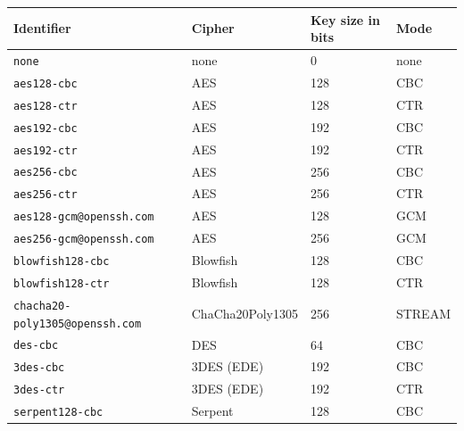\documentclass[synpaper]{book}
\begin{document}
\begin{table}[H]
\begin{small}
\begin{tabular}{|l|l|l|l|}
\hline \textbf{Identifier}                    & \textbf{Cipher} & \textbf{Key size in bits} & \textbf{Mode} \\
\hline \texttt{none}                          & none             & 0                        & none   \\
\hline \texttt{aes128-cbc}                    & AES              & 128                      & CBC    \\
\hline \texttt{aes128-ctr}                    & AES              & 128                      & CTR    \\
\hline \texttt{aes192-cbc}                    & AES              & 192                      & CBC    \\
\hline \texttt{aes192-ctr}                    & AES              & 192                      & CTR    \\
\hline \texttt{aes256-cbc}                    & AES              & 256                      & CBC    \\
\hline \texttt{aes256-ctr}                    & AES              & 256                      & CTR    \\
\hline \texttt{aes128-gcm@openssh.com}        & AES              & 128                      & GCM    \\
\hline \texttt{aes256-gcm@openssh.com}        & AES              & 256                      & GCM    \\
\hline \texttt{blowfish128-cbc}               & Blowfish         & 128                      & CBC    \\
\hline \texttt{blowfish128-ctr}               & Blowfish         & 128                      & CTR    \\
\hline \texttt{chacha20-poly1305@openssh.com} & ChaCha20Poly1305 & 256                      & STREAM \\
\hline \texttt{des-cbc}                       & DES              & 64                       & CBC    \\
\hline \texttt{3des-cbc}                      & 3DES (EDE)       & 192                      & CBC    \\
\hline \texttt{3des-ctr}                      & 3DES (EDE)       & 192                      & CTR    \\
\hline \texttt{serpent128-cbc}                & Serpent          & 128                      & CBC    \\

\end{tabular}
\end{small}
\end{table}
\end{document}
